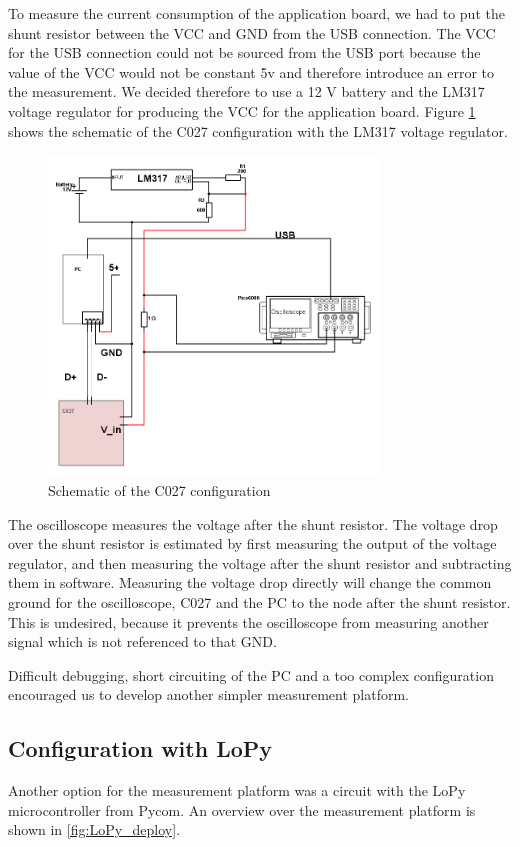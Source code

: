 To measure the current consumption of the application board, we had to put the shunt resistor between the VCC and GND from the USB connection. The VCC for the USB connection could not be sourced from the USB port because the value of the VCC would not be constant 5v and therefore introduce an error to the measurement. We decided therefore to use a 12 V battery and the LM317 voltage regulator for producing the VCC for the application board. Figure \ref{fig:Schematic_C027} shows the schematic of the C027 configuration with the LM317 voltage regulator. 

\begin{figure}[H]
\centering
\includegraphics[height=8.5cm]{Project_Report/Images/C027_Schematic.png}
\caption{Schematic of the C027 configuration}
\label{fig:Schematic_C027}
\end{figure}

The oscilloscope measures the voltage after the shunt resistor. The voltage drop over the shunt resistor is estimated by first measuring the output of the voltage regulator, and then measuring the voltage after the shunt resistor and subtracting them in software. Measuring the voltage drop directly will change the common ground for the oscilloscope, C027 and the PC to the node after the shunt resistor. This is undesired, because it prevents the oscilloscope from measuring another signal which is not referenced to that GND. 

Difficult debugging, short circuiting of the PC and a too complex configuration encouraged us to develop another simpler measurement platform. 



\subsection{Configuration with LoPy}
Another option for the measurement platform was a circuit with the LoPy microcontroller from Pycom. An overview over the measurement platform is shown in \ref{fig:LoPy_deploy}. 

